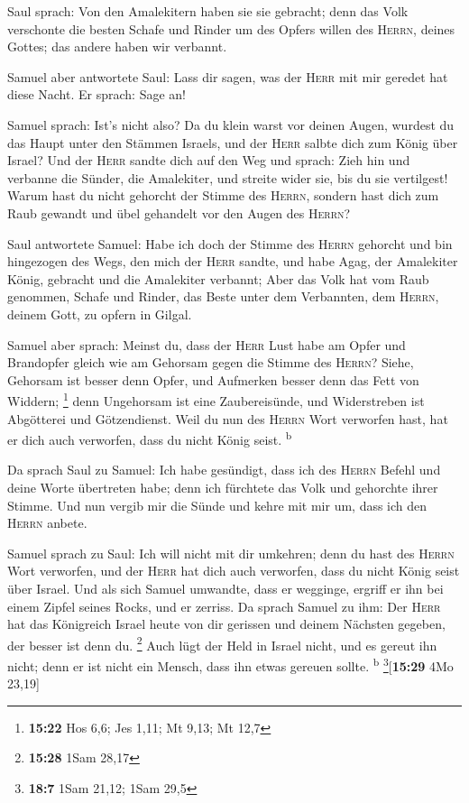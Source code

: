  Saul sprach: Von den Amalekitern haben sie sie gebracht;
denn das Volk verschonte die besten Schafe und Rinder um des Opfers
willen des \textsc{Herrn}, deines Gottes; das andere haben wir verbannt.

 Samuel aber antwortete Saul: Lass dir sagen, was der
\textsc{Herr} mit mir geredet hat diese Nacht. Er sprach: Sage an!

 Samuel sprach: Ist's nicht also? Da du klein warst vor
deinen Augen, wurdest du das Haupt unter den Stämmen Israels, und der
\textsc{Herr} salbte dich zum König über Israel?  Und der
\textsc{Herr} sandte dich auf den Weg und sprach: Zieh hin und verbanne
die Sünder, die Amalekiter, und streite wider sie, bis du sie
vertilgest!  Warum hast du nicht gehorcht der Stimme des
\textsc{Herrn}, sondern hast dich zum Raub gewandt und übel gehandelt
vor den Augen des \textsc{Herrn}?

 Saul antwortete Samuel: Habe ich doch der Stimme des
\textsc{Herrn} gehorcht und bin hingezogen des Wegs, den mich der
\textsc{Herr} sandte, und habe Agag, der Amalekiter König, gebracht und
die Amalekiter verbannt;  Aber das Volk hat vom Raub
genommen, Schafe und Rinder, das Beste unter dem Verbannten, dem
\textsc{Herrn}, deinem Gott, zu opfern in Gilgal.

 Samuel aber sprach: Meinst du, dass der \textsc{Herr}
Lust habe am Opfer und Brandopfer gleich wie am Gehorsam gegen die
Stimme des \textsc{Herrn}? Siehe, Gehorsam ist besser denn Opfer, und
Aufmerken besser denn das Fett von Widdern; \footnote{\textbf{15:22} Hos
  6,6; Jes 1,11; Mt 9,13; Mt 12,7}  denn Ungehorsam ist
eine Zaubereisünde, und Widerstreben ist Abgötterei und Götzendienst.
Weil du nun des \textsc{Herrn} Wort verworfen hast, hat er dich auch
verworfen, dass du nicht König seist. \textsuperscript{b}

 Da sprach Saul zu Samuel: Ich habe gesündigt, dass ich
des \textsc{Herrn} Befehl und deine Worte übertreten habe; denn ich
fürchtete das Volk und gehorchte ihrer Stimme.  Und nun
vergib mir die Sünde und kehre mit mir um, dass ich den \textsc{Herrn}
anbete.

 Samuel sprach zu Saul: Ich will nicht mit dir umkehren;
denn du hast des \textsc{Herrn} Wort verworfen, und der \textsc{Herr}
hat dich auch verworfen, dass du nicht König seist über Israel.
 Und als sich Samuel umwandte, dass er wegginge, ergriff
er ihn bei einem Zipfel seines Rocks, und er zerriss.  Da
sprach Samuel zu ihm: Der \textsc{Herr} hat das Königreich Israel heute
von dir gerissen und deinem Nächsten gegeben, der besser ist denn du.
\footnote{\textbf{15:28} 1Sam 28,17}  Auch lügt der Held
in Israel nicht, und es gereut ihn nicht; denn er ist nicht ein Mensch,
dass ihn etwas gereuen sollte. \textsuperscript{b}
\footnote{\textbf{18:7} 1Sam 21,12; 1Sam 29,5}{[}\textbf{15:29} 4Mo
23,19{]}

